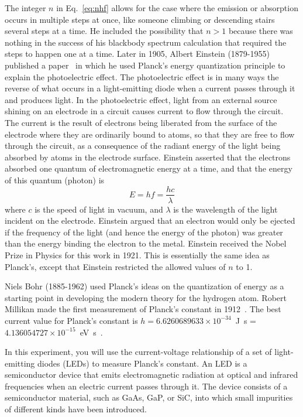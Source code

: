\documentclass{revtex4}
\begin{document}
The integer $n$ in Eq.~\ref{eq:nhf} allows for the case where the
emission or absorption occurs in multiple steps at once, like someone
climbing or descending stairs several steps at a time.  He included the
possibility that $n>1$ because there was nothing in the success of his
blackbody spectrum calculation that required the steps to happen one at
a time.  Later in 1905, Albert Einstein (1879-1955) published a
paper~\cite{Einstein05} in which he used Planck's energy quantization
principle to explain the photoelectric effect. The photoelectric effect
is in many ways the reverse of what occurs in a light-emitting diode when
a current passes through it and produces light.  In the photoelectric effect,
light from an external source shining on an electrode in a circuit causes
current to flow through the circuit.  The current is the result of electrons
being liberated from the surface of the electrode where they are ordinarily
bound to atoms, so that they are free to flow through the circuit, as a
consequence of the radiant energy of the light being absorbed by atoms in
the electrode surface.  Einstein asserted that the electrons absorbed one
quantum of electromagnetic energy at a time, and that the energy of this
quantum (photon) is
\begin{equation}
E = hf = \frac{hc}{\lambda}
\label{eq:hf}
\end{equation}
where $c$ is the speed of light in vacuum, and $\lambda$ is the wavelength
of the light incident on the electrode.  Einstein argued that an electron
would only be ejected if the frequency of the light (and hence the energy
of the photon) was greater than the energy binding the electron to the metal.
Einstein received the Nobel Prize in Physics for this work in 1921.  This is
essentially the same idea as Planck's, except that Einstein restricted the
allowed values of $n$ to 1.

Niels Bohr (1885-1962) used Planck's ideas on
the quantization of energy as a starting point in developing the modern
theory for the hydrogen atom.  Robert Millikan made the first measurement
of Planck's constant in 1912~\cite{Millikan12}.
The best current value for Planck's constant
is $h = 6.6260689633\times 10^{-34}$~J~s =
$4.136054727\times 10^{-15}$~eV~s~\cite{PDG2010}.

In this experiment, you will use the current-voltage relationship of a set of
light-emitting diodes (LEDs) to measure Planck's constant. An LED is a
semiconductor device that emits electromagnetic radiation at optical and
infrared frequencies when an electric current passes through it. The device
consists of a semiconductor material, such as GaAs, GaP, or SiC, into which
small impurities of different kinds have been introduced.
\end{document}
